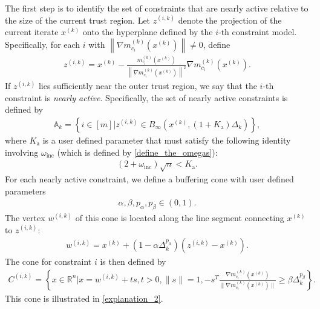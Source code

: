 \documentclass{article}
\theoremstyle{case}
\numberwithin{theorem}{subsection}
\newcommand{\activeconstraintsk}{{\mathbb A_{k}}}
\newcommand{\dk}{\Delta_k}
\newcommand{\gmcik}{{\nabla m_{c_i}^{(k)}\left(\xk\right)}}
\newcommand{\hgik}{{\frac{\nabla m^{(k)}_{c_i}(\xk)}{\|\nabla m^{(k)}_{c_i}\left(\xk\right)\|}}}
\newcommand{\omegainc}{\omega_{\text{inc}}}
\newcommand{\Rn}{\mathbb R^n}
\newcommand{\wik}{{w^{(i, k)}}}
\newcommand{\xk}{x^{(k)}}
\newcommand{\zik}{{z^{(i, k)}}}
\newcommand{\fik}{{C^{(i, k)}}}
\newcommand{\zikthresh}{{ K_{\textrm{a}} }}
\begin{document}
The first step is to identify the set of constraints that are nearly active relative to the size of the current trust region.
Let $\zik$ denote the projection of the current iterate $\xk$ onto the hyperplane defined by the $i$-th constraint model.
Specifically, for each $i$ with $\left\|\gmcik\right\| \ne 0$, define
\begin{align}
\zik = \xk - \frac{m^{(k)}_{c_i}(\xk)}{\left\|\gmcik\right\|^2} \gmcik. \label{define_z}
\end{align}
If $\zik$ lies sufficiently near the outer trust region, we say that the $i$-th constraint is \emph{nearly active}.
Specifically, the set of nearly active constraints is defined by
\begin{align}
\activeconstraintsk = \left\{i \in [m] \bigg| \zik \in B_{\infty}\left(\xk, (1+\zikthresh)\dk\right)\right\}, \label{define_activeconstraints}
\end{align}
where $\zikthresh$ is a user defined parameter that must satisfy the following identity involving $\omegainc$ (which is defined by \cref{define_the_omegas}):
\begin{align}
(2 + \omegainc)\sqrt{n} < \zikthresh. \label{define_zikthresh}
\end{align}
For each nearly active constraint, we define a buffering cone with user defined parameters
\begin{align}
\alpha, \beta, p_{\alpha}, p_{\beta} \in (0, 1). \label{define_abpab}
\end{align}
The vertex $\wik$ of this cone is located along the line segment connecting $\xk$ to $\zik$:
\begin{align}
\wik = \xk + \left(1 - \alpha\dk^{p_{\alpha}}\right)\left(\zik - \xk\right). \label{define_w}
\end{align}
The cone for constraint $i$ is then defined by
\begin{align}
\fik = \left\{x \in \Rn | x = \wik + t s,t > 0, \|s\| = 1, -s^T\hgik \ge \beta \dk^{p_{\beta}} \right\}. \label{define_fik}
\end{align}
This cone is illustrated in \cref{explanation_2}.
\end{document}
